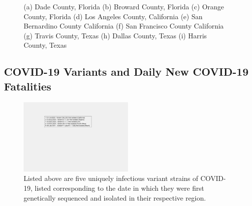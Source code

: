 \documentclass[]{article}
\begin{document}
\begin{figure}
	\caption{(a) Dade County, Florida (b) Broward County, Florida (c) Orange County, Florida (d) Los Angeles County, California (e) San Bernardino County California (f) San Francisco County California (g) Travis County, Texas (h) Dallas County, Texas (i) Harris County, Texas}
	\label{fig:foobar}
\end{figure}


\FloatBarrier
\vspace{5mm}
\subsection{COVID-19 Variants and Daily New COVID-19 Fatalities}


\begin{figure}[!h]
	\centering
	\includegraphics[width=0.50\textwidth]{legends/variant_strains_legend.png}
	\caption{Listed above are five uniquely infectious variant strains of COVID-19,  listed corresponding to the date in which they were first genetically sequenced and isolated in their respective region.}
	\label{fig:legends/variant_strains_legendLabel}
\end{figure}
\end{document}
